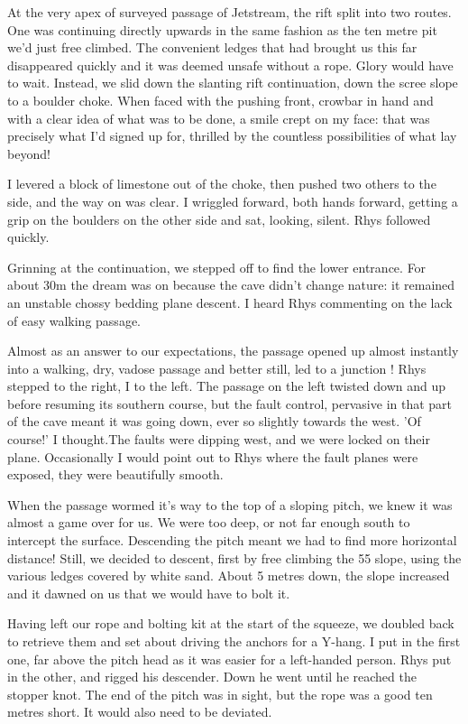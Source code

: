 At the very apex of surveyed passage of Jetstream, the rift split into two routes. One was continuing directly upwards in the same fashion as the ten metre pit we'd just free climbed. The convenient ledges that had brought us this far disappeared quickly and it was deemed unsafe without a rope. Glory would have to wait. Instead, we slid down the slanting rift continuation, down the scree slope to a boulder choke. When faced with the pushing front, crowbar in hand and with a clear idea of what was to be done, a smile crept on my face: that was precisely what I'd signed up for, thrilled by the countless possibilities of what lay beyond!

I levered a block of limestone out of the choke, then pushed two others to the side, and the way on was clear. I wriggled forward, both hands forward, getting a grip on the boulders on the other side and sat, looking, silent. Rhys followed quickly.

Grinning at the continuation, we stepped off to find the lower entrance. For about 30m the dream was on because the cave didn't change nature: it remained an unstable chossy bedding plane descent. I heard Rhys commenting on the lack of easy walking passage.

Almost as an answer to our expectations,  the passage opened up almost instantly into a walking, dry, vadose passage and better still, led to a junction ! Rhys stepped to the right, I to the left. The passage on the left twisted down and up before resuming its southern course,  but the fault control, pervasive in that part of the cave meant it was going down, ever so slightly towards the west. 'Of course!' I thought.The faults were dipping west, and we were locked on their plane. Occasionally I would point out to Rhys where the fault planes were exposed, they were beautifully smooth.

When the passage wormed it's way to the top of a sloping pitch, we knew it was almost a game over for us. We were too deep, or not far enough south to intercept the surface. Descending the pitch meant we had to find more horizontal distance! Still, we decided to descent, first by free climbing the 55 slope, using the various ledges covered by white sand. About 5 metres down, the slope increased and it dawned on us that we would have to bolt it. 

Having left our rope and bolting kit at the start of the squeeze, we doubled back to retrieve them and set about driving the anchors for a Y-hang. I put in the first one, far above the pitch head as it was easier for a left-handed person. Rhys put in the other, and rigged his descender. Down he went until he reached the stopper knot. The end of the pitch was in sight, but the rope was a good ten metres short. It would also need to be deviated.
 
